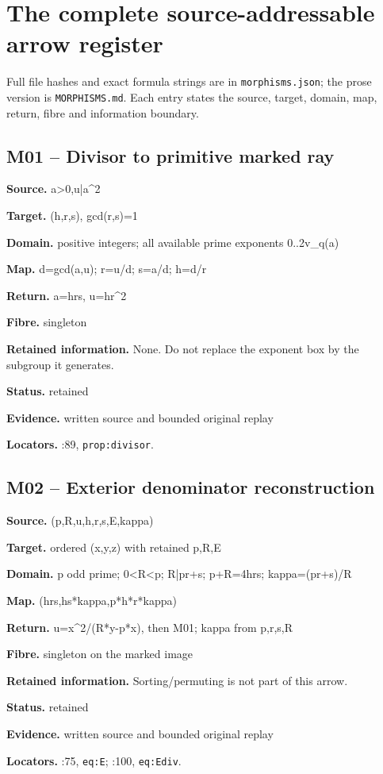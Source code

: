 \section{The complete source-addressable arrow register}
Full file hashes and exact formula strings are in \texttt{morphisms.json}; the prose version is \texttt{MORPHISMS.md}. Each entry states the source, target, domain, map, return, fibre and information boundary.
\subsection*{M01 -- Divisor to primitive marked ray}
\noindent\textbf{Source.} a>0,u|a\textasciicircum{}2\par
\noindent\textbf{Target.} (h,r,s), gcd(r,s)=1\par
\noindent\textbf{Domain.} positive integers; all available prime exponents 0..2v\_q(a)\par
\noindent\textbf{Map.} d=gcd(a,u); r=u/d; s=a/d; h=d/r\par
\noindent\textbf{Return.} a=hrs, u=hr\textasciicircum{}2\par
\noindent\textbf{Fibre.} singleton\par
\noindent\textbf{Retained information.} None. Do not replace the exponent box by the subgroup it generates.\par
\noindent\textbf{Status.} retained\par
\noindent\textbf{Evidence.} written source and bounded original replay\par
\noindent\textbf{Locators.} :89, \texttt{prop:divisor}.
\subsection*{M02 -- Exterior denominator reconstruction}
\noindent\textbf{Source.} (p,R,u,h,r,s,E,kappa)\par
\noindent\textbf{Target.} ordered (x,y,z) with retained p,R,E\par
\noindent\textbf{Domain.} p odd prime; 0<R<p; R|pr+s; p+R=4hrs; kappa=(pr+s)/R\par
\noindent\textbf{Map.} (hrs,hs*kappa,p*h*r*kappa)\par
\noindent\textbf{Return.} u=x\textasciicircum{}2/(R*y-p*x), then M01; kappa from p,r,s,R\par
\noindent\textbf{Fibre.} singleton on the marked image\par
\noindent\textbf{Retained information.} Sorting/permuting is not part of this arrow.\par
\noindent\textbf{Status.} retained\par
\noindent\textbf{Evidence.} written source and bounded original replay\par
\noindent\textbf{Locators.} :75, \texttt{eq:E}; :100, \texttt{eq:Ediv}.
